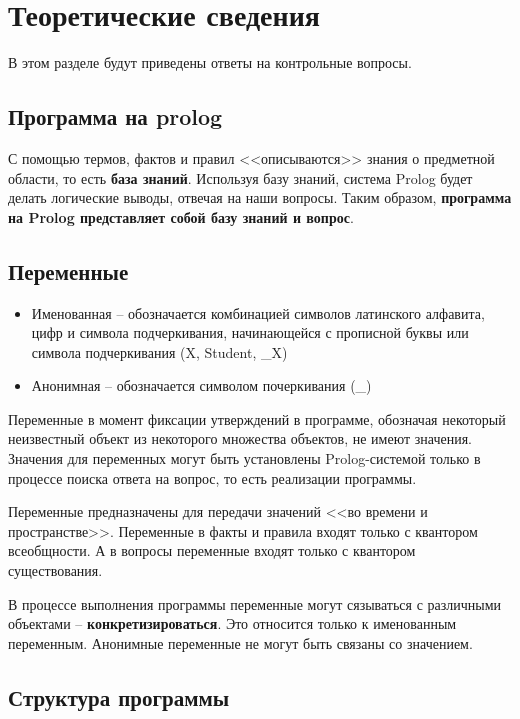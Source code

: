 \chapter{Теоретические сведения}

В этом разделе будут приведены ответы на контрольные вопросы.

\section{Программа на prolog}

С помощью термов, фактов и правил <<описываются>> знания о предметной области, то есть \textbf{база знаний}. Используя базу знаний, система Prolog будет делать логические выводы, отвечая на наши вопросы. Таким образом, \textbf{программа на Prolog представляет собой базу знаний и вопрос}.

\section{Переменные}

\begin{itemize}
    \item Именованная -- обозначается комбинацией символов латинского алфавита, цифр и символа подчеркивания, начинающейся с прописной буквы или символа подчеркивания (X, Student, \_X)
    \item Анонимная -- обозначается символом почеркивания (\_)
\end{itemize}

Переменные в момент фиксации утверждений в программе, обозначая некоторый неизвестный объект из некоторого множества объектов, не имеют значения. Значения для переменных могут быть установлены Prolog-системой только в процессе поиска ответа на вопрос, то есть реализации программы.

Переменные предназначены для передачи значений <<во времени и пространстве>>. Переменные в факты и правила входят только с квантором всеобщности. А в вопросы переменные входят только с квантором существования.

В процессе выполнения программы переменные могут сязываться с различными объектами -- \textbf{конкретизироваться}. Это относится только к именованным переменным. Анонимные переменные не могут быть связаны со значением.

\section{Структура программы}


